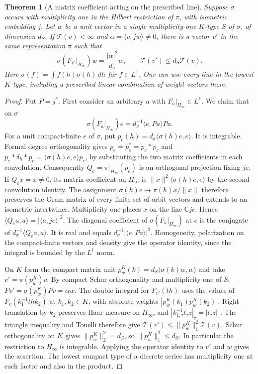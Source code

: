 \documentclass[a4paper,11pt]{article}
\newtheorem{theorem}[proposition]{Theorem}
\theoremstyle{definition}
\theoremstyle{remark}
\numberwithin{equation}{section}
\begin{document}
\begin{theorem}[A matrix coefficient acting on the prescribed line]
\leavevmode\label{thm:compact248}
Suppose \(\sigma\) occurs with multiplicity one in the Hilbert
restriction of \(\pi\), with isometric embedding \(j\). Let \(w\)
be a unit vector in a single multiplicity-one \(K\)-type \(S\) of
\(\sigma\), of dimension \(d_S\). If \(\mathcal T(v)<\infty\) and
\(\alpha=\langle v,jw\rangle\ne0\), there is a vector \(v'\) in the
same representation \(\pi\) such that
\[
 \sigma(F_{v'}|_{H_\infty})w
      = \frac{|\alpha|^2}{d_\sigma}w,\qquad
                    \mathcal T(v')\le d_S\mathcal T(v).
\]
Here \(\sigma(f)=\int f(h)\sigma(h)\,dh\) for \(f\in L^1\).
One can use every line in the lowest \(K\)-type, including a
prescribed linear combination of weight vectors there.
\end{theorem}
\begin{proof}
Put \(P=j^*\). First consider an arbitrary \(a\) with
\(F_a|_{H_\infty}\in L^1\). We claim that on \(\sigma\)
\[
     \sigma(F_a|_{H_\infty})e
          =d_\sigma^{-1}\langle e,Pa\rangle Pa .
\]
For a unit compact-finite \(e\) of \(\sigma\), put
\(p_e(h)=d_\sigma\overline{\langle\sigma(h)e,e\rangle}\).
It is integrable. Formal degree orthogonality gives
\(p_e=p_e^*=p_e*p_e\) and
\(p_e*\delta_h*p_e=\langle\sigma(h)e,e\rangle p_e\), by substituting
the two matrix coefficients in each convolution. Consequently
\(Q_e=\pi|_{H_\infty}(p_e)\) is an orthogonal projection fixing \(je\).
If \(Q_e x=x\ne0\), its matrix coefficient on \(H_\infty\) is
\(\|x\|^2\langle\sigma(h)e,e\rangle\) by the second convolution
identity. The assignment \(\sigma(h)e\mapsto\pi(h)x/\|x\|\)
therefore preserves the Gram matrix of every finite set of orbit
vectors and extends to an isometric intertwiner. Multiplicity one
places \(x\) on the line \(\mathbb C je\). Hence
\(\langle Q_e a,a\rangle=|\langle a,je\rangle|^2\).
The diagonal coefficient of \(\sigma(F_a|_{H_\infty})\) at \(e\) is
the conjugate of \(d_\sigma^{-1}\langle Q_e a,a\rangle\). It is real
and equals \(d_\sigma^{-1}|\langle e,Pa\rangle|^2\). Homogeneity,
polarization on the compact-finite vectors and density give the
operator identity, since the integral is bounded by the \(L^1\) norm.

On \(K\) form the compact matrix unit
\(p_w^K(k)=d_S\overline{\langle\sigma(k)w,w\rangle}\) and take
\(v'=\pi(p_w^K)v\). By compact Schur orthogonality and multiplicity
one of \(S\), \(Pv'=\sigma(p_w^K)Pv=\alpha w\).
The double integral for \(F_{v'}(th)\) uses the values of
\(F_v(k_1^{-1}thk_2)\) at \(k_1,k_2\in K\), with absolute weights
\(|p_w^K(k_1)p_w^K(k_2)|\). Right translation by \(k_2\) preserves
Haar measure on \(H_\infty\), and
\(|k_{1,\tau}^{-1}t_\tau z|_\tau=|t_\tau z|_\tau\). The triangle
inequality and Tonelli therefore give
\(\mathcal T(v')\le\|p_w^K\|_1^2\mathcal T(v)\).
Schur orthogonality on \(K\) gives \(\|p_w^K\|_2^2=d_S\), so
\(\|p_w^K\|_1^2\le d_S\). In particular the restriction to
\(H_\infty\) is integrable. Applying the operator identity to \(v'\)
and \(w\) gives the assertion. The lowest compact type of a discrete
series has multiplicity one at each factor and also in the product.
\end{proof}
\end{document}
